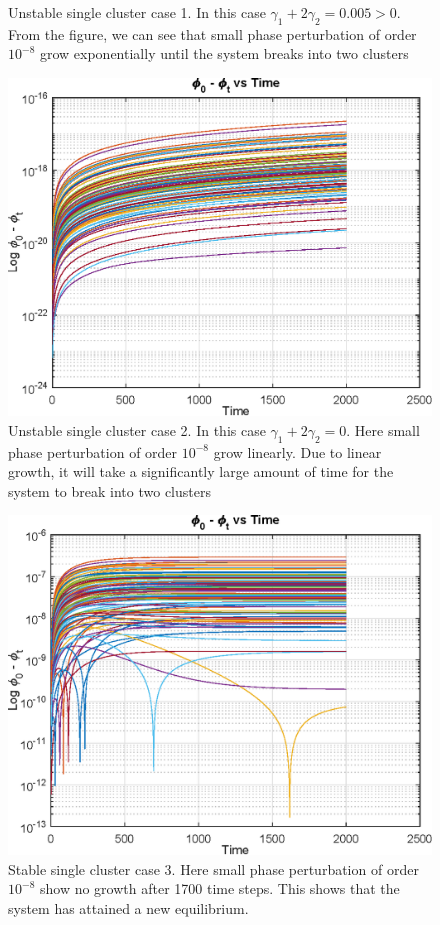 \documentclass[twocolumn,10pt]{asme2ej}
\begin{document}
{{\begin{figure}[h!]
            \caption{Unstable single cluster case 1. In this case \(\gamma_1 + 2\gamma_2 = 0.005 > 0\). From the figure, we can see that small phase perturbation of order \(10^{-8}\) grow exponentially until the system breaks into two clusters}
            \label{fig:case1}
        \end{figure}
        \begin{figure}[h!]
            \includegraphics[width = \linewidth]{LinearUnstable.eps}
            \caption{Unstable single cluster case 2. In this case \(\gamma_1 + 2\gamma_2 = 0\). Here small phase perturbation of order \(10^{-8}\) grow linearly. Due to linear growth, it will take a significantly large amount of time for the system to break into two clusters}
            \label{fig:case2}
        \end{figure}
        \begin{figure}[h!]
            \includegraphics[width = \linewidth]{negativeStable.eps}
            \caption{Stable single cluster case 3. Here small phase perturbation of order \(10^{-8}\) show no growth after 1700 time steps. This shows that the system has attained a new equilibrium.}
            \label{fig:case3}
        \end{figure}

}}
\end{document}
